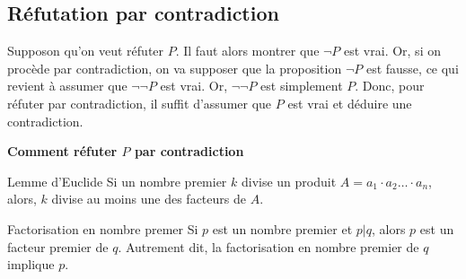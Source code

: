 \documentclass[16pt]{report}
\begin{document}
\begin{multicols*}{2}
            \section{\textbf{\textcolor{myb}{Réfutation par contradiction}}}
            Supposon qu'on veut réfuter $P$. Il faut alors montrer que $\neg P$ est vrai. Or, si on procède par 
            contradiction, on va supposer que la proposition $\neg P$ est fausse, ce qui revient à 
            assumer que $\neg \neg P$ est vrai. Or, $\neg \neg P$ est simplement $P$. 
            Donc, pour réfuter par contradiction, il suffit d'assumer que $P$ est 
            vrai et déduire une contradiction. 



            \begin{center}
            \textbf{Comment réfuter $P$ par contradiction}  
            \\
            \noindent{}
            \end{center}


            \begin{Lemme}{Lemme d'Euclide}{}
                Si un nombre premier $k$ divise un produit $A = a_1 \cdot a_2 \dots \cdot a_n$, alors, $k$ divise 
                au moins une des facteurs de $A$. 
            \end{Lemme}

            \begin{Lemme}{Factorisation en nombre premer}{}
                Si $p$ est un nombre premier et $p|q$, alors $p$ est un facteur premier de $q$. Autrement dit, 
                la factorisation en nombre premier de $q$ implique $p$. 
                
            \end{Lemme}
\end{multicols*}
\end{document}
